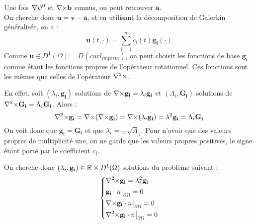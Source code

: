 Une fois ${\nabla}\psi^0$ et ${\nabla\times} \mathbf{b}$ connus, on peut retrouver $\mathbf{a}$.\\

On cherche donc $\mathbf{u}=\mathbf{v}-\mathbf{a}$, et en utilisant la décomposition de Galerkin généralisée, on a :
\begin{equation}
\label{u}
\mathbf{u}(t,\cdot) = \sum_{i=1}^{\infty} c_i(t)\mathbf{g_i}(\cdot)
\end{equation}
Comme $\mathbf{u}\in D^1(\Omega)=D(curl_{imperm})$, on peut choisir les fonctions de base
$\mathbf{g_i}$ comme étant les fonctions propres de l'opérateur rotationnel. Ces
fonctions sont les mêmes que celles de l'opérateur ${\nabla^2\times}$.

En effet, soit $(\lambda_i,\mathbf{g_i})$ solutions de ${\nabla\times} \mathbf{g_i} = \lambda_i\mathbf{g_i}$ et $(\Lambda_i,\mathbf{G_i})$ solutions de ${\nabla^2\times} \mathbf{G_i} = \Lambda_i\mathbf{G_i}$. Alors :
\[
{\nabla^2\times} \mathbf{g_i} = {\nabla\times}({\nabla\times} \mathbf{g_i})={\nabla\times}(\lambda_i\mathbf{g_i})=\lambda^2\mathbf{g_i} = \Lambda_i\mathbf{G_i}
\]
On voit donc que $\mathbf{g_i}=\mathbf{G_i}$ et que $\lambda_i=\pm\sqrt\Lambda_i$. Pour n'avoir que des valeurs propres de multiplicité une, on ne garde que les valeurs propres positives, le signe étant porté par le coefficient $c_i$.

On cherche donc $(\lambda_i,\mathbf{g_i})\in{\mathbb{R}}\times D^1(\Omega)$ solutions du problème suivant :
\begin{equation}
\label{curlcurl}
\left\{
\begin{aligned}
&{\nabla^2\times}  \mathbf{g_i} = \lambda_i^2 \mathbf{g_i}\\
&\mathbf{g_i}\cdot n{\big\rvert_{\partial\Omega}} = 0\\
&{\nabla\times} \mathbf{g_i}\cdot n{\big\rvert_{\partial\Omega}} = 0\\
&{\nabla^2\times}  \mathbf{g_i}\cdot n{\big\rvert_{\partial\Omega}} = 0
\end{aligned}
\right.
\end{equation}

